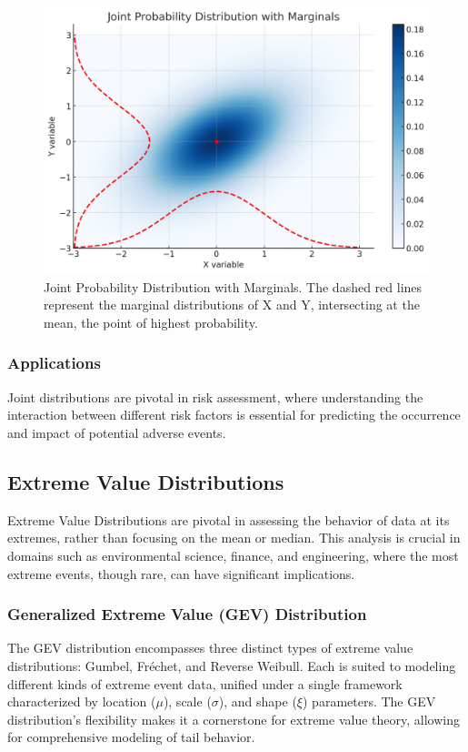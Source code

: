 \begin{figure}
\includegraphics[width=\linewidth]{figures/2dis.png}
\caption{Joint Probability Distribution with Marginals. The dashed red lines represent the marginal distributions of X and Y, intersecting at the mean, the point of highest probability.}
\label{fig:distributions}
\end{figure}


\subsubsection*{Applications}
Joint distributions are pivotal in risk assessment, where understanding the interaction between different risk factors is essential for predicting the occurrence and impact of potential adverse events.

\subsection*{Extreme Value Distributions}

Extreme Value Distributions are pivotal in assessing the behavior of data at its extremes, rather than focusing on the mean or median. This analysis is crucial in domains such as environmental science, finance, and engineering, where the most extreme events, though rare, can have significant implications.

\subsubsection*{Generalized Extreme Value (GEV) Distribution}
The GEV distribution encompasses three distinct types of extreme value distributions: Gumbel, Fréchet, and Reverse Weibull. Each is suited to modeling different kinds of extreme event data, unified under a single framework characterized by location (\( \mu \)), scale (\( \sigma \)), and shape (\( \xi \)) parameters. The GEV distribution's flexibility makes it a cornerstone for extreme value theory, allowing for comprehensive modeling of tail behavior.

